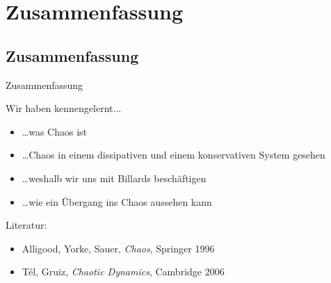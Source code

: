 \section{Zusammenfassung}

\subsection{Zusammenfassung}

\begin{frame}{Zusammenfassung}

  Wir haben kennengelernt...

  \begin{itemize}
  \item \dots was \alert{Chaos} ist
  \item \dots Chaos in einem dissipativen und einem konservativen System gesehen
  \item \dots weshalb wir uns mit \alert{Billards} beschäftigen
  \item \dots wie ein \alert{Übergang} ins Chaos aussehen kann
  \end{itemize}

  Literatur:
  \begin{itemize}
  \item Alligood, Yorke, Sauer, \emph{Chaos}, Springer 1996
  \item T\'el, Gruiz, \emph{Chaotic Dynamics}, Cambridge 2006
  \end{itemize}

\end{frame}
